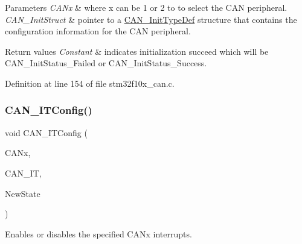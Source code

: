 \begin{DoxyParams}{Parameters}
{\em C\+A\+Nx} & where x can be 1 or 2 to to select the C\+AN peripheral. \\
\hline
{\em C\+A\+N\+\_\+\+Init\+Struct} & pointer to a \hyperlink{struct_c_a_n___init_type_def}{C\+A\+N\+\_\+\+Init\+Type\+Def} structure that contains the configuration information for the C\+AN peripheral. \\
\hline
\end{DoxyParams}

\begin{DoxyRetVals}{Return values}
{\em Constant} & indicates initialization succeed which will be C\+A\+N\+\_\+\+Init\+Status\+\_\+\+Failed or C\+A\+N\+\_\+\+Init\+Status\+\_\+\+Success. \\
\hline
\end{DoxyRetVals}


Definition at line 154 of file stm32f10x\+\_\+can.\+c.

\mbox{\label{group___c_a_n___private___functions_gad1a8b2499a780b5bfa4accb3597b02f4}} 
\subsubsection{\texorpdfstring{C\+A\+N\+\_\+\+I\+T\+Config()}{CAN\_ITConfig()}}
{\footnotesize\ttfamily void C\+A\+N\+\_\+\+I\+T\+Config (\begin{DoxyParamCaption}\item[{\hyperlink{struct_c_a_n___type_def}{C\+A\+N\+\_\+\+Type\+Def} $\ast$}]{C\+A\+Nx,  }\item[{uint32\+\_\+t}]{C\+A\+N\+\_\+\+IT,  }\item[{\hyperlink{group___exported__types_gac9a7e9a35d2513ec15c3b537aaa4fba1}{Functional\+State}}]{New\+State }\end{DoxyParamCaption})}



Enables or disables the specified C\+A\+Nx interrupts. 


